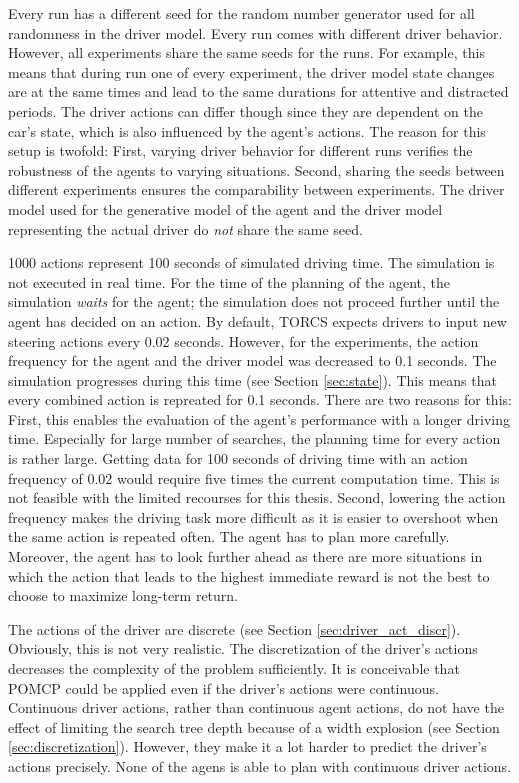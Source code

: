 Every run has a different seed for the random number generator used for all randomness in the driver model. Every run comes with different driver behavior. However, all experiments share the same seeds for the runs. For example, this means that during run one of every experiment, the driver model state changes are at the same times and lead to the same durations for attentive and distracted periods. The driver actions can differ though since they are dependent on the car's state, which is also influenced by the agent's actions. The reason for this setup is twofold: First, varying driver behavior for different runs verifies the robustness of the agents to varying situations. Second, sharing the seeds between different experiments ensures the comparability between experiments. The driver model used for the generative model of the agent and the driver model representing the actual driver do \emph{not} share the same seed.

1000 actions represent 100 seconds of simulated driving time. The simulation is not executed in real time. For the time of the planning of the agent, the simulation \emph{waits} for the agent; the simulation does not proceed further until the agent has decided on an action. By default, TORCS expects drivers to input new steering actions every 0.02 seconds. However, for the experiments, the action frequency for the agent and the driver model was decreased to 0.1 seconds. The simulation progresses during this time (see Section \ref{sec:state}). This means that every combined action is repreated for 0.1 seconds. There are two reasons for this: First, this enables the evaluation of the agent's performance with a longer driving time. Especially for large number of searches, the planning time for every action is rather large. Getting data for 100 seconds of driving time with an action frequency of 0.02 would require five times the current computation time. This is not feasible with the limited recourses for this thesis. Second, lowering the action frequency makes the driving task more difficult as it is easier to overshoot when the same action is repeated often. The agent has to plan more carefully.  Moreover, the agent has to look further ahead as there are more situations in which the action that leads to the highest immediate reward is not the best to choose to maximize long-term return.

The actions of the driver are discrete (see Section \ref{sec:driver_act_discr}). Obviously, this is not very realistic. The discretization of the driver's actions decreases the complexity of the problem sufficiently. It is conceivable that POMCP could be applied even if the driver's actions were continuous. Continuous driver actions, rather than continuous agent actions, do not have the effect of limiting the search tree depth because of a width explosion (see Section \ref{sec:discretization}). However, they make it a lot harder to predict the driver's actions precisely. None of the agens is able to plan with continuous driver actions. 

